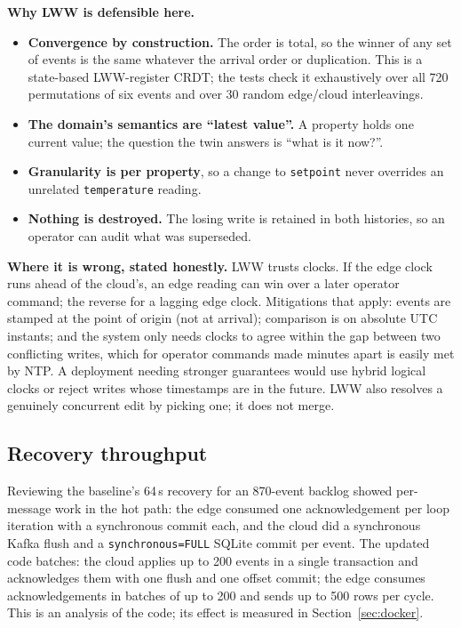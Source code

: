 \documentclass[11pt,a4paper]{article}
\begin{document}
\textbf{Why LWW is defensible here.}
\begin{itemize}[nosep]
\item \textbf{Convergence by construction.} The order is total, so the winner of any set of events is the
same whatever the arrival order or duplication. This is a state-based LWW-register CRDT; the tests check
it exhaustively over all 720 permutations of six events and over 30 random edge/cloud interleavings.
\item \textbf{The domain's semantics are ``latest value''.} A property holds one current value; the
question the twin answers is ``what is it now?''.
\item \textbf{Granularity is per property}, so a change to \texttt{setpoint} never overrides an
unrelated \texttt{temperature} reading.
\item \textbf{Nothing is destroyed.} The losing write is retained in both histories, so an operator
can audit what was superseded.
\end{itemize}

\textbf{Where it is wrong, stated honestly.} LWW trusts clocks. If the edge clock runs ahead of the
cloud's, an edge reading can win over a later operator command; the reverse for a lagging edge clock.
Mitigations that apply: events are stamped at the point of origin (not at arrival); comparison is on
absolute UTC instants; and the system only needs clocks to agree within the gap between two conflicting
writes, which for operator commands made minutes apart is easily met by NTP. A deployment needing
stronger guarantees would use hybrid logical clocks or reject writes whose timestamps are in the
future. LWW also resolves a genuinely concurrent edit by picking one; it does not merge.

\subsection{Recovery throughput}
Reviewing the baseline's 64\,s recovery for an 870-event backlog showed per-message work in the hot path:
the edge consumed one acknowledgement per loop iteration with a synchronous commit each, and the
cloud did a synchronous Kafka flush and a \texttt{synchronous=FULL} SQLite commit per event. The updated
code batches: the cloud applies up to 200 events in a single transaction and acknowledges them with one
flush and one offset commit; the edge consumes acknowledgements in batches of up to 200 and sends up to
500 rows per cycle. This is an analysis of the code; its effect is measured in Section~\ref{sec:docker}.
\end{document}
